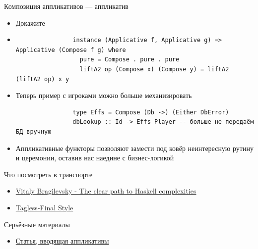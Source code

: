     \begin{frame}[fragile]{Композиция аппликативов --- аппликатив}
        \begin{itemize}
            \item[\todo] Докажите
            \item[\answer] \pause
            \begin{verbatim}
                instance (Applicative f, Applicative g) => Applicative (Compose f g) where
                  pure = Compose . pure . pure
                  liftA2 op (Compose x) (Compose y) = liftA2 (liftA2 op) x y
            \end{verbatim}
            \item Теперь пример с игроками можно больше механизировать
            \begin{verbatim}
                type Effs = Compose (Db ->) (Either DbError)
                dbLookup :: Id -> Effs Player -- больше не передаём БД вручную
            \end{verbatim}
            \item[\NB] Аппликативные функторы позволяют замести под ковёр неинтересную рутину и церемонии, оставив нас наедине с бизнес-логикой
        \end{itemize}
    \end{frame}


    \begin{frame}[fragile]{Что посмотреть в транспорте}
        \begin{itemize}
            \item \href{https://youtu.be/n3H_YipBDrY?si=bsR5Fj56GEAIpAGE}{\color{blue} Vitaly Bragilevsky - The clear path to Haskell complexities}
            \item \href{https://youtu.be/MbFqJ2NHS8M?si=LamIrSnrjbwCYrt2}{\color{blue}  Tagless-Final Style}
        \end{itemize}
    \end{frame}

    \begin{frame}[fragile]{Серьёзные материалы}
        \begin{itemize}
            \item \href{https://www.staff.city.ac.uk/~ross/papers/Applicative.html}{\color{blue}Статья, вводящая аппликативы}
        \end{itemize}
    \end{frame}


